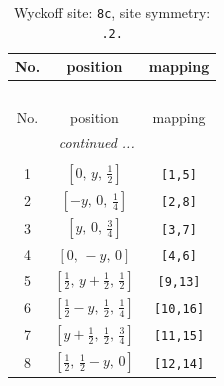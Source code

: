 \documentclass[fleqn,8pt]{jsarticle}
\begin{document}
\begin{longtable}{ccc}
\caption{Wyckoff site: {\tt 8c}, site symmetry: {\tt .2.}}
 \\
 \hline \hline
No. & position & mapping \\ \hline \endfirsthead

\multicolumn{2}{l}{\tablename\ \thetable{}} \\
 \hline \hline
No. & position & mapping \\ \hline \endhead

 \hline \hline
\multicolumn{2}{r}{\footnotesize\it continued ...} \\ \endfoot

 \hline \hline
\multicolumn{2}{r}{} \\ \endlastfoot

1 & $\left[ 0,\, y,\, \frac{1}{2} \right]$ & {\tt [1,5]} \\ \hline
2 & $\left[ - y,\, 0,\, \frac{1}{4} \right]$ & {\tt [2,8]} \\ \hline
3 & $\left[ y,\, 0,\, \frac{3}{4} \right]$ & {\tt [3,7]} \\ \hline
4 & $\left[ 0,\, - y,\, 0 \right]$ & {\tt [4,6]} \\ \hline
5 & $\left[ \frac{1}{2},\, y + \frac{1}{2},\, \frac{1}{2} \right]$ & {\tt [9,13]} \\ \hline
6 & $\left[ \frac{1}{2} - y,\, \frac{1}{2},\, \frac{1}{4} \right]$ & {\tt [10,16]} \\ \hline
7 & $\left[ y + \frac{1}{2},\, \frac{1}{2},\, \frac{3}{4} \right]$ & {\tt [11,15]} \\ \hline
8 & $\left[ \frac{1}{2},\, \frac{1}{2} - y,\, 0 \right]$ & {\tt [12,14]} \\
\end{longtable}
\renewcommand{\arraystretch}{1.2}
\end{document}
